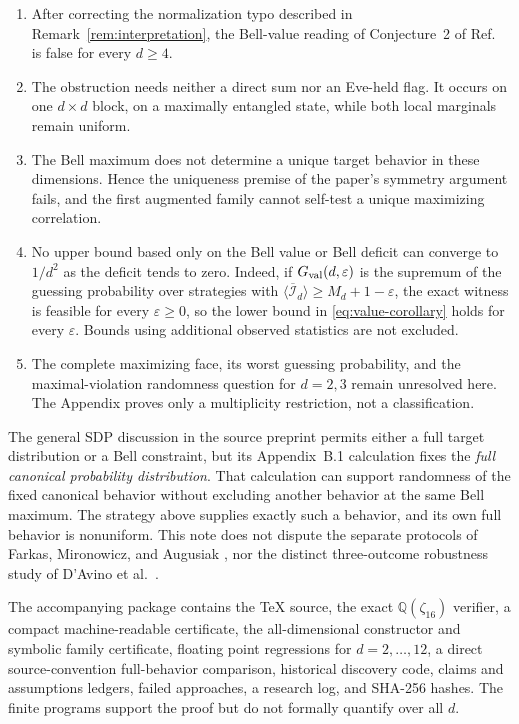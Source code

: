 \documentclass[11pt]{article}
\theoremstyle{remark}
\newcommand{\cI}{\mathcal I}
\begin{document}
\begin{enumerate}[leftmargin=1.55em]
  \item After correcting the normalization typo described in
  Remark~\ref{rem:interpretation}, the Bell-value reading of Conjecture~2 of
  Ref.~\cite{PeritoEtAl2026} is false for every \(d\geq4\).
  \item The obstruction needs neither a direct sum nor an Eve-held flag.
  It occurs on one \(d\times d\) block, on a maximally entangled state, while
  both local marginals remain uniform.
  \item The Bell maximum does not determine a unique target behavior in these
  dimensions.  Hence the uniqueness premise of the paper's symmetry argument
  fails, and the first augmented family cannot self-test a unique maximizing
  correlation.
  \item No upper bound based only on the Bell value or Bell deficit can
  converge to \(1/d^2\) as the deficit tends to zero.  Indeed, if
  \(G_{\rm val}(d,\varepsilon)\) is the supremum of the guessing probability
  over strategies with
  \(\langle\overline{\cI}_d\rangle\geq M_d+1-\varepsilon\), the exact witness
  is feasible for every \(\varepsilon\geq0\), so the lower bound in
  \eqref{eq:value-corollary} holds for every \(\varepsilon\).  Bounds using
  additional observed statistics are not excluded.
  \item The complete maximizing face, its worst guessing probability, and the
  maximal-violation randomness question for \(d=2,3\) remain unresolved here.
  The Appendix proves only a multiplicity restriction, not a classification.
\end{enumerate}

The general SDP discussion in the source preprint permits either a full target
distribution or a Bell constraint, but its Appendix~B.1 calculation fixes the
\emph{full canonical probability distribution}.  That calculation can
support randomness of the fixed canonical behavior without excluding another
behavior at the same Bell maximum.  The strategy above supplies exactly such
a behavior, and its own full behavior is nonuniform.  This note does not
dispute the separate protocols of Farkas, Mironowicz, and Augusiak
\cite{FarkasEtAl2026}, nor the distinct three-outcome robustness study of
D'Avino et al.~\cite{DavinoEtAl2026}.

The accompanying package contains the TeX source, the exact
\(\mathbb Q(\zeta_{16})\) verifier, a compact machine-readable certificate,
the all-dimensional constructor and symbolic family certificate, floating
point regressions for \(d=2,\ldots,12\), a direct source-convention
full-behavior comparison, historical discovery code, claims and assumptions
ledgers, failed approaches, a research log, and SHA-256 hashes.
The finite programs support the proof but do not formally quantify over all
\(d\).
\end{document}
